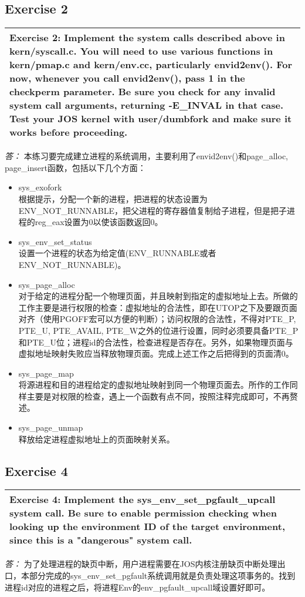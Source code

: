 \documentclass[11pt,a4paper]{article}
\newcommand{\exercise}[2]{
\begin{tabular}{|p{\textwidth}|}
\hline
#1: #2\\
\hline
\end{tabular}
\textit{\large{答：}}}
\begin{document}
\subsection{Exercise 2}
\exercise{Exercise 2}{Implement the system calls described above in kern/syscall.c. You will need to use various functions in kern/pmap.c and kern/env.cc, particularly envid2env(). For now, whenever you call envid2env(), pass 1 in the checkperm parameter. Be sure you check for any invalid system call arguments, returning -E\_INVAL in that case. Test your JOS kernel with user/dumbfork and make sure it works before proceeding. }
本练习要完成建立进程的系统调用，主要利用了envid2env()和page\_alloc, page\_insert函数，包括以下几个方面：
\begin{itemize}
\item sys\_exofork \\
根据提示，分配一个新的进程，把进程的状态设置为ENV\_NOT\_RUNNABLE，把父进程的寄存器值复制给子进程，但是把子进程的reg\_eax设置为0以使该函数返回0。
\item sys\_env\_set\_status \\
设置一个进程的状态为给定值(ENV\_RUNNABLE或者ENV\_NOT\_RUNNABLE)。
\item sys\_page\_alloc \\
对于给定的进程分配一个物理页面，并且映射到指定的虚拟地址上去。所做的工作主要是进行权限的检查：虚拟地址的合法性，即在UTOP之下及要跟页面对齐（使用PGOFF宏可以方便的判断）；访问权限的合法性，不得对PTE\_P, PTE\_U, PTE\_AVAIL, PTE\_W之外的位进行设置，同时必须要具备PTE\_P和PTE\_U位；进程id的合法性，检查进程是否存在。另外，如果物理页面与虚拟地址映射失败应当释放物理页面。完成上述工作之后把得到的页面清0。\\
\item sys\_page\_map \\
将源进程和目的进程给定的虚拟地址映射到同一个物理页面去。所作的工作同样主要是对权限的检查，遇上一个函数有点不同，按照注释完成即可，不再赘述。\\
\item sys\_page\_unmap \\
释放给定进程虚拟地址上的页面映射关系。
\end{itemize}

\subsection{Exercise 4}
\exercise{Exercise 4}{Implement the sys\_env\_set\_pgfault\_upcall system call. Be sure to enable permission checking when looking up the environment ID of the target environment, since this is a "dangerous" system call. }
为了处理进程的缺页中断，用户进程需要在JOS内核注册缺页中断处理出口，本部分完成的sys\_env\_set\_pgfault系统调用就是负责处理这项事务的。找到进程id对应的进程之后，将进程Env的env\_pgfault\_upcall域设置好即可。
\end{document}
